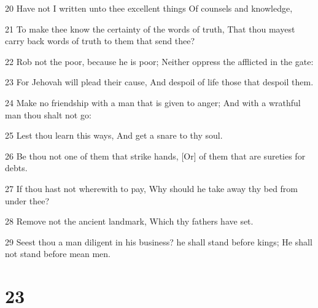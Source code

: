 \par 20 Have not I written unto thee excellent things Of counsels and knowledge,
\par 21 To make thee know the certainty of the words of truth, That thou mayest carry back words of truth to them that send thee?
\par 22 Rob not the poor, because he is poor; Neither oppress the afflicted in the gate:
\par 23 For Jehovah will plead their cause, And despoil of life those that despoil them.
\par 24 Make no friendship with a man that is given to anger; And with a wrathful man thou shalt not go:
\par 25 Lest thou learn this ways, And get a snare to thy soul.
\par 26 Be thou not one of them that strike hands, [Or] of them that are sureties for debts.
\par 27 If thou hast not wherewith to pay, Why should he take away thy bed from under thee?
\par 28 Remove not the ancient landmark, Which thy fathers have set.
\par 29 Seest thou a man diligent in his business? he shall stand before kings; He shall not stand before mean men.

\chapter{23}

